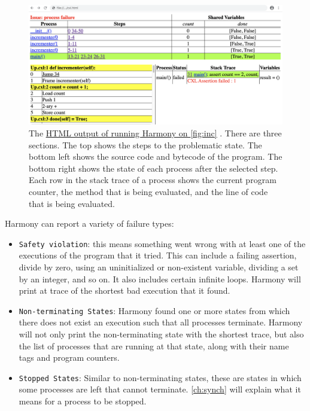 \documentclass{report}
\newcommand{\harmonyref}[2]{%
\href{https://www.cs.cornell.edu/home/rvr/harmony/output/#1}{\underline{#2}}%
}
\begin{document}
\begin{figure}
\includegraphics[width=\textwidth]{figures/Up1.png}
\caption{The
\harmonyref{Up.html}{HTML output of running Harmony on \autoref{fig:inc}}.
There are three sections.
The top shows the steps to the problematic state.
The bottom left shows the source code and bytecode
of the program.
The bottom right shows the state of each process after the selected step.
Each row in the stack trace of a process shows the current program counter,
the method that is being evaluated, and the line of code that is
being evaluated.}
\label{fig:inchtml1}
\end{figure}

Harmony can report a variety of failure types:
\begin{itemize}
\item \texttt{Safety violation}: this means something went wrong with
at least one of the executions of the program that it tried.  This
can include a failing assertion, divide by zero, using an uninitialized
or non-existent variable, dividing a set by an integer, and so on.
It also includes certain infinite loops.
Harmony will print at trace of the shortest bad execution that it found.
\item \texttt{Non-terminating States}: Harmony found one or more states
from which there does not exist an execution such that all processes
terminate.  Harmony will not only print the non-terminating state with
the shortest trace, but also the list of processes that are running
at that state, along with their name tags and program counters.
\item \texttt{Stopped States}: Similar to non-terminating states,
these are states in which some processes are left that cannot
terminate.  \autoref{ch:synch} will explain what it means for
a process to be stopped.
\end{itemize}
\end{document}
